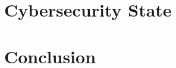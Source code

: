 \documentclass[conference,flushend]{iaria} %
\begin{document}


\section{Cybersecurity State}

\section{Conclusion}

\printbibliography
\end{document}
